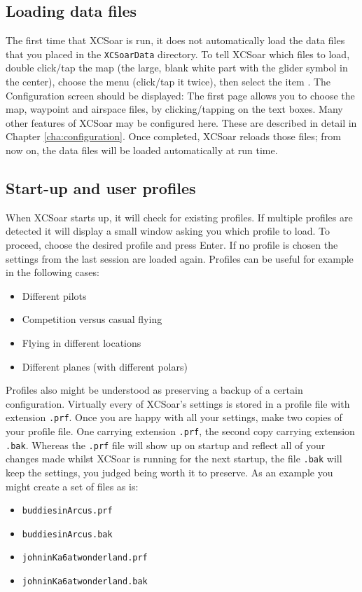 \subsection*{Loading data files}\label{sec:loaddatafiles}
The first time that XCSoar is run, it does not automatically load the 
data files that you placed in the \verb|XCSoarData| directory.  
To tell XCSoar which files to load, double click/tap the map (the large,
blank white part with the glider symbol in the center),
choose the menu  (click/tap it twice), then select the item 
\mbox{.}  The Configuration screen should be displayed:
The first page allows you to choose the map, 
waypoint and airspace files, by clicking/tapping on the text boxes.
Many other features of XCSoar may be configured here. These are described in detail in Chapter
\ref{cha:configuration}.
Once completed, XCSoar reloads those files; from now on, the data files
will be loaded automatically at run time.

\subsection*{Start-up and user profiles}\label{sec:profiles}
When XCSoar starts up, it will check for existing profiles. If multiple
profiles are detected it will display a small window asking you which profile
to load. To proceed, choose the desired profile and press Enter. If no
profile is chosen the settings from the last session are loaded again. Profiles
can be useful for example in the following cases:
\begin{itemize}
\item Different pilots
\item Competition versus casual flying
\item Flying in different locations
\item Different planes (with different polars)
\end{itemize}
Profiles also might be understood as preserving a backup of a certain 
configuration. Virtually every of XCSoar's settings is stored in a profile 
file with extension \texttt{.prf}. Once you are happy with all your settings, 
make two copies of your profile file. One carrying extension \texttt{.prf}, 
the second copy carrying extension \texttt{.bak}.
Whereas the \texttt{.prf} file will show up on startup and reflect all of 
your changes made whilst XCSoar is running for the next startup, the file 
\texttt{.bak} will keep the settings, you judged being worth it to preserve. 
As an example you might create a set of files as is:
\begin{itemize}
\item \texttt{buddiesinArcus.prf}
\item \texttt{buddiesinArcus.bak}
\item \texttt{johninKa6atwonderland.prf}
\item \texttt{johninKa6atwonderland.bak}
\end{itemize}

